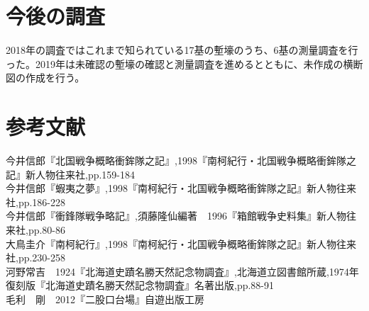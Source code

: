 \documentclass[14Q]{jsarticle}
\begin{document}
\section{今後の調査}
2018年の調査ではこれまで知られている17基の塹壕のうち、6基の測量調査を行った。2019年は未確認の塹壕の確認と測量調査を進めるとともに、未作成の横断図の作成を行う。


\section*{参考文献}
\noindent
今井信郎『北国戦争概略衝鉾隊之記』,1998『南柯紀行・北国戦争概略衝鉾隊之記』新人物往来社,pp.159-184\\
今井信郎『蝦夷之夢』,1998『南柯紀行・北国戦争概略衝鉾隊之記』新人物往来社,pp.186-228\\
今井信郎『衝鋒隊戦争略記』,須藤隆仙編著　1996『箱館戦争史料集』新人物往来社,pp.80-86\\
大鳥圭介『南柯紀行』,1998『南柯紀行・北国戦争概略衝鉾隊之記』新人物往来社,pp.230-258\\
河野常吉　1924『北海道史蹟名勝天然記念物調査』,北海道立図書館所蔵,1974年復刻版『北海道史蹟名勝天然記念物調査』名著出版,pp.88-91\\
毛利　剛　2012『二股口台場』自遊出版工房
\end{document}
